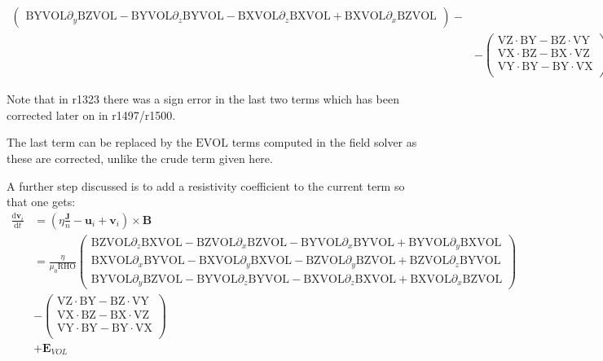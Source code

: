 \documentclass[a4paper,10pt]{article}
\newcommand{\vv}[1]{\mathbf{#1}}
\newcommand{\dif}{\mathrm{d}}
\newcommand{\pp}[1]{\left(#1\right)}
\begin{document}
\begin{align}
\begin{pmatrix}
      \textrm{BYVOL}\partial_y\textrm{BZVOL} - \textrm{BYVOL}\partial_z\textrm{BYVOL} - \textrm{BXVOL}\partial_z\textrm{BXVOL} + \textrm{BXVOL}\partial_x\textrm{BZVOL}
   \end{pmatrix}
   - \\
   &- \begin{pmatrix}
      \textrm{VZ}\cdot\textrm{BY} - \textrm{BZ}\cdot\textrm{VY} \\
      \textrm{VX}\cdot\textrm{BZ} - \textrm{BX}\cdot\textrm{VZ} \\
      \textrm{VY}\cdot\textrm{BY} - \textrm{BY}\cdot\textrm{VX} \\
   \end{pmatrix}
   + \frac{1}{\textrm{RHO}}
   \begin{pmatrix}
      \textrm{BY}\cdot\textrm{RHOVZ} - \textrm{BZ}\cdot\textrm{RHOVY} \\
      \textrm{BZ}\cdot\textrm{RHOVX} - \textrm{BX}\cdot\textrm{RHOVZ} \\
      \textrm{BX}\cdot\textrm{RHOVY} - \textrm{BY}\cdot\textrm{RHOVX}.
   \end{pmatrix}
\end{align}

Note that in r1323 there was a sign error in the last two terms which has been corrected later on in r1497/r1500.

The last term can be replaced by the $\textrm{EVOL}$ terms computed in the field solver as these are corrected, unlike the crude term given here.

A further step discussed is to add a resistivity coefficient to the current term so that one gets:
\begin{align}
   \frac{\dif\vv{v}_i}{\dif t} &= \pp{\eta\frac{\vv{J}}{n} - \vv{u}_i + \vv{v}_i}\times\vv{B} \\
   &= \frac{\eta}{\mu_0 \textrm{RHO}}
   \begin{pmatrix}
      \textrm{BZVOL}\partial_z\textrm{BXVOL} - \textrm{BZVOL}\partial_x\textrm{BZVOL} - \textrm{BYVOL}\partial_x\textrm{BYVOL} + \textrm{BYVOL}\partial_y\textrm{BXVOL} \\
      \textrm{BXVOL}\partial_x\textrm{BYVOL} - \textrm{BXVOL}\partial_y\textrm{BXVOL} - \textrm{BZVOL}\partial_y\textrm{BZVOL} + \textrm{BZVOL}\partial_z\textrm{BYVOL} \\
      \textrm{BYVOL}\partial_y\textrm{BZVOL} - \textrm{BYVOL}\partial_z\textrm{BYVOL} - \textrm{BXVOL}\partial_z\textrm{BXVOL} + \textrm{BXVOL}\partial_x\textrm{BZVOL}
   \end{pmatrix} \\
   &-
   \begin{pmatrix}
      \textrm{VZ}\cdot\textrm{BY} - \textrm{BZ}\cdot\textrm{VY} \\
      \textrm{VX}\cdot\textrm{BZ} - \textrm{BX}\cdot\textrm{VZ} \\
      \textrm{VY}\cdot\textrm{BY} - \textrm{BY}\cdot\textrm{VX} \\
   \end{pmatrix} \\
   &+ \vv{E}_{VOL}
\end{align}
\end{document}
